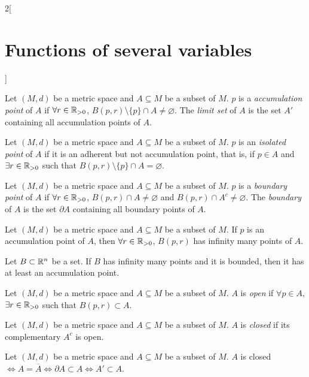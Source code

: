 \documentclass[../../../main_math.tex]{subfiles}
\begin{document}
\begin{multicols}{2}[\section{Functions of several variables}]
\begin{definition}
  \end{definition}
  \begin{definition}
    Let $(M,d)$ be a metric space and $A\subseteq M$ be a subset of $M$. $p$ is a \emph{accumulation point} of $A$ if $\forall r\in\mathbb{R}_{>0}$, $B(p,r)\setminus\{p\}\cap A\ne\varnothing$. The \emph{limit set} of $A$ is the set $A'$ containing all accumulation points of $A$.
  \end{definition}
  \begin{definition}
    Let $(M,d)$ be a metric space and $A\subseteq M$ be a subset of $M$. $p$ is an \emph{isolated point} of $A$ if it is an adherent but not accumulation point, that is, if $p\in A$ and $\exists r\in\mathbb{R}_{>0}$ such that $B(p,r)\setminus\{p\}\cap A=\varnothing$.
  \end{definition}
  \begin{definition}
    Let $(M,d)$ be a metric space and $A\subseteq M$ be a subset of $M$. $p$ is a \emph{boundary point} of $A$ if $\forall r\in\mathbb{R}_{>0}$, $B(p,r)\cap A\ne\varnothing$ and $B(p,r)\cap A^c\ne\varnothing$. The \emph{boundary} of $A$ is the set $\partial A$ containing all boundary points of $A$.
  \end{definition}
  \begin{proposition}
    Let $(M,d)$ be a metric space and $A\subseteq M$ be a subset of $M$. If $p$ is an accumulation point of $A$, then $\forall r\in\mathbb{R}_{>0}$, $B(p,r)$ has infinity many points of $A$.
  \end{proposition}
  \begin{theorem}
    Let $B\subset\mathbb{R}^n$ be a set. If $B$ has infinity many points and it is bounded, then it has at least an accumulation point.
  \end{theorem}
  \begin{definition}
    Let $(M,d)$ be a metric space and $A\subseteq M$ be a subset of $M$. $A$ is \emph{open} if $\forall p\in A$, $\exists r\in\mathbb{R}_{>0}$ such that $B(p,r)\subset A$.
  \end{definition}
  \begin{definition}
    Let $(M,d)$ be a metric space and $A\subseteq M$ be a subset of $M$. $A$ is \emph{closed} if its complementary $A^c$ is open.
  \end{definition}
  \begin{proposition}
    Let $(M,d)$ be a metric space and $A\subseteq M$ be a subset of $M$. $A$ is closed $\iff A=\overline{A}\iff\partial A\subset A\iff A'\subset A$.
  \end{proposition}

\end{multicols}
\end{document}
